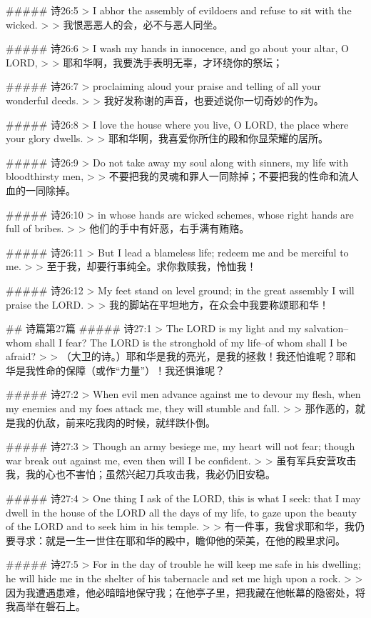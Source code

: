 ##### 诗26:5
> I abhor the assembly of evildoers and refuse to sit with the wicked.
>
> 我恨恶恶人的会，必不与恶人同坐。


##### 诗26:6
> I wash my hands in innocence, and go about your altar, O LORD,
>
> 耶和华啊，我要洗手表明无辜，才环绕你的祭坛；


##### 诗26:7
> proclaiming aloud your praise and telling of all your wonderful deeds.
>
> 我好发称谢的声音，也要述说你一切奇妙的作为。


##### 诗26:8
> I love the house where you live, O LORD, the place where your glory dwells.
>
> 耶和华啊，我喜爱你所住的殿和你显荣耀的居所。


##### 诗26:9
> Do not take away my soul along with sinners, my life with bloodthirsty men,
>
> 不要把我的灵魂和罪人一同除掉；不要把我的性命和流人血的一同除掉。


##### 诗26:10
> in whose hands are wicked schemes, whose right hands are full of bribes.
>
> 他们的手中有奸恶，右手满有贿赂。


##### 诗26:11
> But I lead a blameless life; redeem me and be merciful to me.
>
> 至于我，却要行事纯全。求你救赎我，怜恤我！


##### 诗26:12
> My feet stand on level ground; in the great assembly I will praise the LORD.
>
> 我的脚站在平坦地方，在众会中我要称颂耶和华！


## 诗篇第27篇
##### 诗27:1
> The LORD is my light and my salvation--whom shall I fear? The LORD is the stronghold of my life--of whom shall I be afraid?
>
> （大卫的诗。）耶和华是我的亮光，是我的拯救！我还怕谁呢？耶和华是我性命的保障（或作“力量”）！我还惧谁呢？


##### 诗27:2
> When evil men advance against me to devour my flesh, when my enemies and my foes attack me, they will stumble and fall.
>
> 那作恶的，就是我的仇敌，前来吃我肉的时候，就绊跌仆倒。


##### 诗27:3
> Though an army besiege me, my heart will not fear; though war break out against me, even then will I be confident.
>
> 虽有军兵安营攻击我，我的心也不害怕；虽然兴起刀兵攻击我，我必仍旧安稳。


##### 诗27:4
> One thing I ask of the LORD, this is what I seek: that I may dwell in the house of the LORD all the days of my life, to gaze upon the beauty of the LORD and to seek him in his temple.
>
> 有一件事，我曾求耶和华，我仍要寻求：就是一生一世住在耶和华的殿中，瞻仰他的荣美，在他的殿里求问。


##### 诗27:5
> For in the day of trouble he will keep me safe in his dwelling; he will hide me in the shelter of his tabernacle and set me high upon a rock.
>
> 因为我遭遇患难，他必暗暗地保守我；在他亭子里，把我藏在他帐幕的隐密处，将我高举在磐石上。


